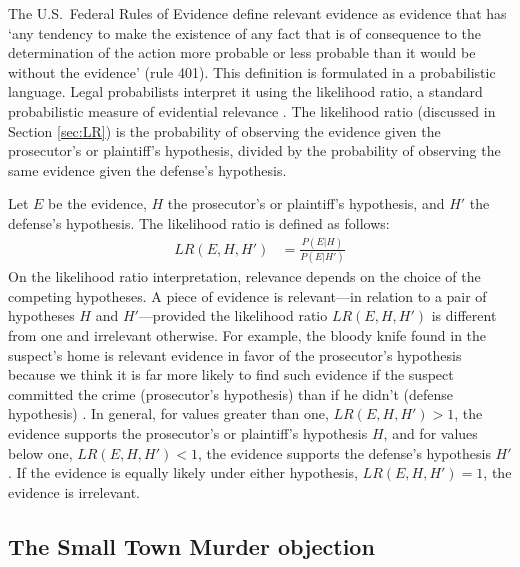 \documentclass{article}
\begin{document}
The U.S.\ Federal Rules of Evidence
define relevant evidence as evidence that has `any tendency to make the existence of any fact that is of consequence to the determination of the action more probable or less probable than it would be without the evidence' (rule 401). 
This definition is formulated in a probabilistic language.
Legal probabilists interpret it using the likelihood ratio, a standard probabilistic measure of 
evidential relevance \citep{lempert1977modeling,lyon1996relevance,aitken2004statistics, aitken2010fundamentals,sullivan2016LikelihoodStoryTheory}.
The likelihood ratio (discussed in Section \ref{sec:LR}) is the probability of observing the evidence given the prosecutor's or plaintiff's hypothesis,  divided by the probability of observing the same evidence given  the defense's hypothesis. 

Let $E$ be the evidence, $H$ the prosecutor's or plaintiff's hypothesis, and $H'$ the defense's hypothesis. The likelihood ratio 
is defined as follows:
\begin{align*}LR(E,H,H') & = \frac{P(E\vert H)}{P(E\vert H')}\end{align*}
On the likelihood ratio interpretation, relevance depends on the choice of the competing hypotheses. 
A piece of evidence is relevant---in relation to a pair of hypotheses $H$ and $H'$---provided the likelihood ratio  $LR(E, H, H')$ 
is different from one and irrelevant otherwise. For example, 
the bloody knife found in the suspect's home is relevant  evidence in favor of the prosecutor's hypothesis because we think it is far more likely to find such evidence if the suspect committed the crime (prosecutor's hypothesis) than if he didn't (defense hypothesis) %
\citep{finkelstein2009basic}. In general, 
for values greater than one, $LR(E, H, H')>1$, the evidence supports the prosecutor's or plaintiff's hypothesis $H$, and for values below one, $LR(E, H, H')<1$, the evidence supports the defense's hypothesis $H'$.
If the evidence is equally likely under either hypothesis,
$LR(E, H, H')=1$, the evidence is  irrelevant. 

\subsection{The Small Town Murder objection}
\end{document}
